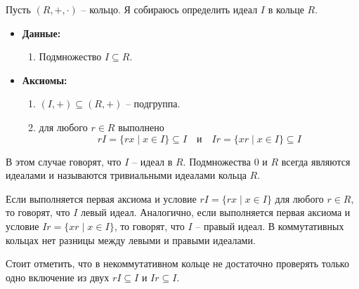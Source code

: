 \begin{definition}
Пусть $(R, +, \cdot)$ -- кольцо.
Я собираюсь определить идеал $I$ в кольце $R$.
\begin{itemize}
\item\textbf{Данные:} 
\begin{enumerate}
\item Подмножество $I\subseteq R$.
\end{enumerate}

\item\textbf{Аксиомы:}
\begin{enumerate}
\item $(I, +)\subseteq (R,+)$ -- подгруппа.

\item для любого $r\in R$ выполнено
\[
r I = \{rx\mid x\in I\} \subseteq I\quad\text{и}\quad Ir = \{xr\mid x\in I\}\subseteq I
\]
\end{enumerate}
\end{itemize}
В этом случае говорят, что $I$ -- идеал в $R$.
Подмножества $0$ и $R$ всегда являются идеалами и называются тривиальными идеалами кольца $R$.

Если выполняется первая аксиома и условие $r I = \{rx\mid x\in I\}$ для любого $r\in R$, то говорят, что $I$ левый идеал.
Аналогично, если выполняется первая аксиома и условие $ Ir = \{xr\mid x\in I\}$, то говорят, что $I$ -- правый идеал.
В коммутативных кольцах нет разницы между левыми и правыми идеалами.
\end{definition}

Стоит отметить, что в некоммутативном кольце не достаточно проверять только одно включение из двух $rI \subseteq I$ и $Ir \subseteq I$.

